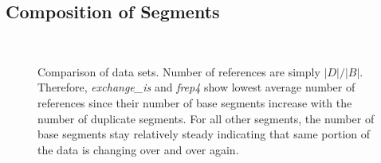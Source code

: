 \subsection {Composition of Segments}

\begin{figure}[!t]
\centering
{}
\\
\captionsetup{format=myformat}
\caption{Comparison of data sets. Number of references are simply $|D|/|B|$. Therefore, \emph{exchange\_is} and \emph{frep4} show lowest average number of references since their number of base segments increase with the number of duplicate segments. For all other segments, the number of base segments stay relatively steady indicating that same portion of the data is changing over and over again.}
\label{data_comp}
\end{figure}

